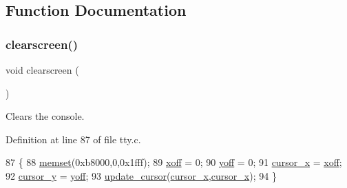 \subsection{Function Documentation}
\mbox{\label{a00176_aff4bc17c602603d120756f52e18ebb96_aff4bc17c602603d120756f52e18ebb96}} 
\subsubsection{\texorpdfstring{clearscreen()}{clearscreen()}}
{\footnotesize\ttfamily void clearscreen (\begin{DoxyParamCaption}{ }\end{DoxyParamCaption})}



Clears the console. 



Definition at line 87 of file tty.\+c.


\begin{DoxyCode}
87                    \{
88     \hyperlink{a00125_a9e432f267691eceb2e2e0efcc37efbc9_a9e432f267691eceb2e2e0efcc37efbc9}{memset}(0xb8000,0,0x1fff);
89     \hyperlink{a00173_abaa0d20f0e52ce0d3a7d706f6ac16266_abaa0d20f0e52ce0d3a7d706f6ac16266}{xoff} = 0;
90     \hyperlink{a00173_a1a7539764d0ae8cd06ce45c62cf92bca_a1a7539764d0ae8cd06ce45c62cf92bca}{yoff} = 0;
91     \hyperlink{a00173_ae69604af0f9bd5fca2a016d0aa1ba7e1_ae69604af0f9bd5fca2a016d0aa1ba7e1}{cursor\_x} = \hyperlink{a00173_abaa0d20f0e52ce0d3a7d706f6ac16266_abaa0d20f0e52ce0d3a7d706f6ac16266}{xoff};
92     \hyperlink{a00173_a0301c5492919c401c2c1ecf52af709b0_a0301c5492919c401c2c1ecf52af709b0}{cursor\_y} = \hyperlink{a00173_a1a7539764d0ae8cd06ce45c62cf92bca_a1a7539764d0ae8cd06ce45c62cf92bca}{yoff};
93     \hyperlink{a00173_a492f5021d7340613e732ef37bbaa04e4_a492f5021d7340613e732ef37bbaa04e4}{update\_cursor}(\hyperlink{a00173_ae69604af0f9bd5fca2a016d0aa1ba7e1_ae69604af0f9bd5fca2a016d0aa1ba7e1}{cursor\_x},\hyperlink{a00173_ae69604af0f9bd5fca2a016d0aa1ba7e1_ae69604af0f9bd5fca2a016d0aa1ba7e1}{cursor\_x});
94 \}
\end{DoxyCode}
\mbox{\label{a00176_a3d09038c7b6436e60b228f2f3f451f6a_a3d09038c7b6436e60b228f2f3f451f6a}} 
